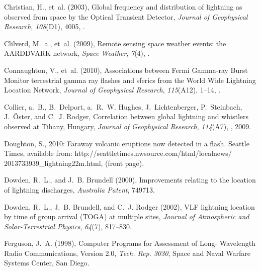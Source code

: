 \documentclass[draft,ras]{agutex}
\begin{document}
\begin{article}
\begin{thebibliography}{23}
Christian, H., et~al. (2003), {Global frequency and distribution of lightning
  as observed from space by the Optical Transient Detector}, \textit{Journal of
  Geophysical Research}, \textit{108}(D1), 4005, .

Clilverd, M.~a., et~al. (2009), {Remote sensing space weather events: the
  AARDDVARK network}, \textit{Space Weather}, \textit{7}(4),
  .

Connaughton, V., et~al. (2010), {Associations between Fermi Gamma-ray Burst
  Monitor terrestrial gamma ray flashes and sferics from the World Wide
  Lightning Location Network}, \textit{Journal of Geophysical Research},
  \textit{115}(A12), 1--14, .

Collier, a.~B., B.~Delport, a.~R.~W. Hughes, J.~Lichtenberger, P.~Steinbach,
  J.~\"{O}ster, and C.~J. Rodger, {Correlation between global lightning and
  whistlers observed at Tihany, Hungary}, \textit{Journal of Geophysical
  Research}, \textit{114}(A7), , 2009.

Doughton, S., 2010: {Faraway volcanic eruptions now detected in a flash}.
  Seattle Times, available from:
  http://seattletimes.nwsource.com/html/localnews/ 2013733939\_lightning22m.html,
  (front page).

Dowden, R.~L., and J.~B. Brundell (2000), {Improvements relating to the
  location of lightning discharges}, \textit{Australia Patent}, 749713.

Dowden, R.~L., J.~B. Brundell, and C.~J. Rodger (2002), {VLF lightning location
  by time of group arrival (TOGA) at multiple sites}, \textit{Journal of
  Atmospheric and Solar-Terrestrial Physics}, \textit{64}(7), 817--830.

Ferguson, J.~A. (1998), {Computer Programs for Assessment of Long- Wavelength
  Radio Communications, Version 2.0}, \textit{Tech. Rep. 3030}, Space and Naval
  Warfare Systems Center, San Diego.


\end{thebibliography}
\end{article}
\end{document}
